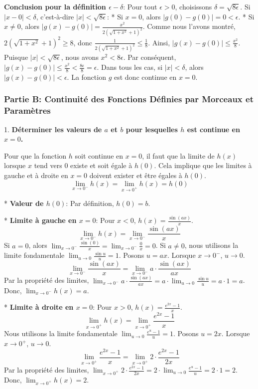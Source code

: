 \documentclass[12pt,a4paper]{report}
\begin{document}
    \textbf{Conclusion pour la définition $\epsilon-\delta$}:
    Pour tout $\epsilon > 0$, choisissons $\delta = \sqrt{8\epsilon}$.
    Si $|x - 0| < \delta$, c'est-à-dire $|x| < \sqrt{8\epsilon}$:
    *   Si $x=0$, alors $|g(0) - g(0)| = 0 < \epsilon$.
    *   Si $x \neq 0$, alors $|g(x) - g(0)| = \frac{x^2}{2(\sqrt{1+x^2} + 1)^2}$.
        Comme nous l'avons montré, $2(\sqrt{1+x^2} + 1)^2 \ge 8$, donc $\frac{1}{2(\sqrt{1+x^2} + 1)^2} \le \frac{1}{8}$.
        Ainsi, $|g(x) - g(0)| \le \frac{x^2}{8}$.
        Puisque $|x| < \sqrt{8\epsilon}$, nous avons $x^2 < 8\epsilon$.
        Par conséquent, $|g(x) - g(0)| \le \frac{x^2}{8} < \frac{8\epsilon}{8} = \epsilon$.
    Dans tous les cas, si $|x| < \delta$, alors $|g(x) - g(0)| < \epsilon$.
    La fonction $g$ est donc continue en $x=0$.

\subsubsection{Partie B: Continuité des Fonctions Définies par Morceaux et Paramètres}

1.  \textbf{Déterminer les valeurs de $a$ et $b$ pour lesquelles $h$ est continue en $x=0$.}

    Pour que la fonction $h$ soit continue en $x=0$, il faut que la limite de $h(x)$ lorsque $x$ tend vers $0$ existe et soit égale à $h(0)$. Cela implique que les limites à gauche et à droite en $x=0$ doivent exister et être égales à $h(0)$.
    $$ \lim_{x \to 0^-} h(x) = \lim_{x \to 0^+} h(x) = h(0) $$

    *   \textbf{Valeur de $h(0)$}:
        Par définition, $h(0) = b$.

    *   \textbf{Limite à gauche en $x=0$}:
        Pour $x < 0$, $h(x) = \frac{\sin(ax)}{x}$.
        $$ \lim_{x \to 0^-} h(x) = \lim_{x \to 0^-} \frac{\sin(ax)}{x} $$
        Si $a=0$, alors $\lim_{x \to 0^-} \frac{\sin(0)}{x} = \lim_{x \to 0^-} \frac{0}{x} = 0$.
        Si $a \neq 0$, nous utilisons la limite fondamentale $\lim_{u \to 0} \frac{\sin u}{u} = 1$.
        Posons $u = ax$. Lorsque $x \to 0^-$, $u \to 0$.
        $$ \lim_{x \to 0^-} \frac{\sin(ax)}{x} = \lim_{x \to 0^-} a \cdot \frac{\sin(ax)}{ax} $$
        Par la propriété des limites, $\lim_{x \to 0^-} a \cdot \frac{\sin(ax)}{ax} = a \cdot \lim_{u \to 0} \frac{\sin u}{u} = a \cdot 1 = a$.
        Donc, $\lim_{x \to 0^-} h(x) = a$.

    *   \textbf{Limite à droite en $x=0$}:
        Pour $x > 0$, $h(x) = \frac{e^{2x} - 1}{x}$.
        $$ \lim_{x \to 0^+} h(x) = \lim_{x \to 0^+} \frac{e^{2x} - 1}{x} $$
        Nous utilisons la limite fondamentale $\lim_{u \to 0} \frac{e^u - 1}{u} = 1$.
        Posons $u = 2x$. Lorsque $x \to 0^+$, $u \to 0$.
        $$ \lim_{x \to 0^+} \frac{e^{2x} - 1}{x} = \lim_{x \to 0^+} 2 \cdot \frac{e^{2x} - 1}{2x} $$
        Par la propriété des limites, $\lim_{x \to 0^+} 2 \cdot \frac{e^{2x} - 1}{2x} = 2 \cdot \lim_{u \to 0} \frac{e^u - 1}{u} = 2 \cdot 1 = 2$.
        Donc, $\lim_{x \to 0^+} h(x) = 2$.
\end{document}
